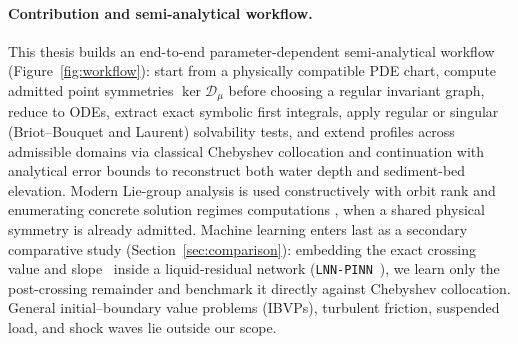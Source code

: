 \documentclass[12pt,a4paper,oneside]{report}
\numberwithin{equation}{chapter}
\theoremstyle{definition}
\theoremstyle{remark}\newtheorem{remark}[theorem]{Remark}
\begin{document}
\paragraph{Contribution and semi-analytical workflow.}
This thesis builds an end-to-end parameter-dependent semi-analytical workflow (Figure~\ref{fig:workflow}): start from a physically compatible PDE chart, compute admitted point symmetries $\ker\mathscr D_\mu$ before choosing a regular invariant graph, reduce to ODEs, extract exact symbolic first integrals, apply regular or singular (Briot--Bouquet and Laurent) solvability tests, and extend profiles across admissible domains via classical Chebyshev collocation and continuation with analytical error bounds to reconstruct both water depth and sediment-bed elevation. Modern Lie-group analysis is used constructively with orbit rank and enumerating concrete solution regimes computations 
, when a shared physical symmetry is already admitted. Machine learning enters last as a secondary comparative study (Section~\ref{sec:comparison}): embedding the exact crossing value and slope~\cite{arora2023,nagesh2025} inside a liquid-residual network (\texttt{LNN-PINN}~\cite{tao2026}), we learn only the post-crossing remainder and benchmark it directly against Chebyshev collocation. General initial--boundary value problems (IBVPs), turbulent friction, suspended load, and shock waves lie outside our scope.
\end{document}
